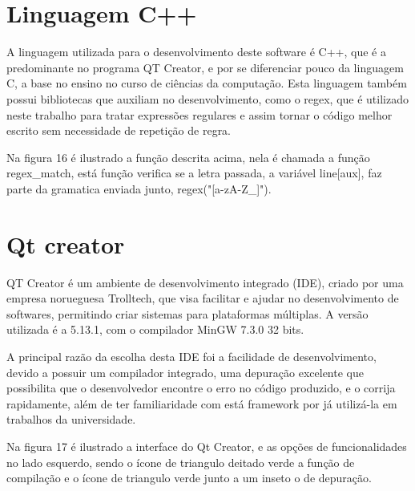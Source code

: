 \documentclass[12pt,oneside,a4paper,chapter=TITLE,section=TITLE,sumario=tradicional]{abntex2}
\begin{document}
\section{Linguagem C++}
\label{sec:linugagemc++}

A linguagem utilizada para o desenvolvimento deste software é C++, que é a predominante no programa QT Creator, e por se diferenciar pouco da linguagem C, a base no ensino no curso de ciências da computação. Esta linguagem também possui bibliotecas que auxiliam no desenvolvimento, como o regex, que é utilizado neste trabalho para tratar expressões regulares e assim tornar o código melhor escrito sem necessidade de repetição de regra.

Na figura 16 é ilustrado a função descrita acima, nela é chamada a função regex\_match, está função verifica se a letra passada, a variável line[aux], faz parte da gramatica enviada junto, regex("[a-zA-Z\_]").

\begin{figure}[htb]
\end{figure} 

\section{Qt creator}
\label{sec:qtcreator}

QT Creator é um ambiente de desenvolvimento integrado (IDE), criado por uma empresa norueguesa Trolltech, que visa facilitar e ajudar no desenvolvimento de softwares, permitindo criar sistemas para plataformas múltiplas. A versão utilizada é a 5.13.1, com o compilador MinGW 7.3.0 32 bits. 

A principal razão da escolha desta IDE foi a facilidade de desenvolvimento, devido a possuir um compilador integrado, uma depuração excelente que possibilita que o desenvolvedor encontre o erro no código produzido, e o corrija rapidamente, além de ter familiaridade com está framework por já utilizá-la em trabalhos da universidade. 

Na figura 17 é ilustrado a interface do Qt Creator, e as opções de funcionalidades no lado esquerdo, sendo o ícone de triangulo deitado verde a função de compilação e o ícone de triangulo verde junto a um inseto o de depuração.

\begin{figure}[htb]
\end{figure} 
\end{document}
